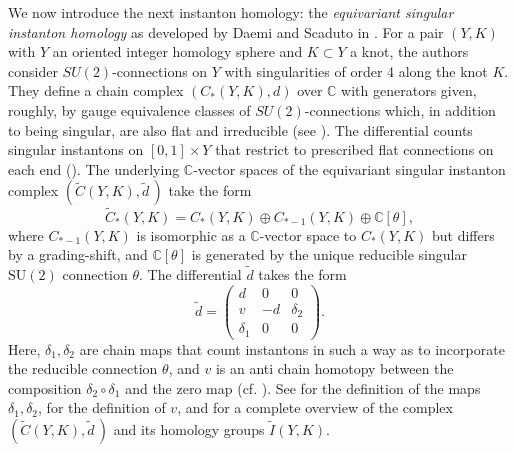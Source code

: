 \documentclass[11pt]{amsart}
\newcommand{\C}{\mathbb{C}}
\newcommand\SU{\mathrm{SU}}
\begin{document}
We now introduce the next instanton homology: the \emph{equivariant singular instanton homology} as developed by Daemi and Scaduto in \cite{DS-singular, DS-clasp}. For a pair $(Y,K)$ with $Y$ an oriented integer homology sphere and $K\subset Y$ a knot, the authors consider $SU(2)$-connections on $Y$ with singularities of order 4 along the knot $K$. They define a chain complex $\left(C_*(Y, K),d\right)$ over $\C$ with generators given, roughly, by gauge equivalence classes of $SU(2)$-connections which, in addition to being singular, are also flat and irreducible (see \cite[Section 2.2]{DS-singular}). The differential counts singular instantons on $[0,1]\times Y$ that restrict to prescribed flat connections on each end (\cite[Sections 2.5 and 3.1]{DS-singular}). The underlying $\C$-vector spaces of the equivariant singular instanton complex $\left(\widetilde{C}(Y, K),\tilde{d}\,\right)$ take the form
\begin{equation}\label{eq: equivariant singular chain complex}
\widetilde{C}_*(Y, K)= C_* (Y, K)\oplus C_{*-1}(Y, K) \oplus \C[\theta],\end{equation}
where $C_{*-1}(Y, K)$ is isomorphic as a $\C$-vector space to $C_* (Y, K)$ but differs by a grading-shift, and $\C[\theta]$ is generated by the unique reducible singular $\SU(2)$ connection $\theta$. The differential $\tilde{d}$ takes the form \begin{equation}
    \tilde{d}= \begin{pmatrix}
d & 0 & 0 \\
v & -d & \delta_2 \\  
\delta_1 & 0 & 0 
\end{pmatrix}.\end{equation}
Here, $\delta_1,\delta_2$ are chain maps that count instantons in such a way as to incorporate the reducible connection $\theta$, and $v$ is an anti chain homotopy between the composition $\delta_2\circ \delta_1$ and the zero map (cf. \cite[Proposition 3.16]{DS-singular}). See \cite[Section 3.2]{DS-singular} for the definition of the maps $\delta_1,\delta_2$, \cite[Section 3.3.2]{DS-singular} for the definition of $v$, and \cite[Section 3.4]{DS-singular} for a complete overview of the complex $(\widetilde{C}(Y, K),\tilde{d}\,)$ and its homology groups $\widetilde{I}(Y, K)$.
\end{document}
